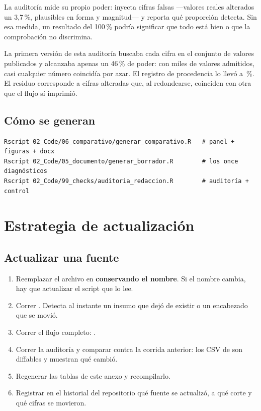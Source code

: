 \documentclass[11pt,a4paper]{article}
\begin{document}
\begin{hallazgo}[title={Una comprobación que nunca falla no demuestra nada}]
La auditoría mide su propio poder: inyecta cifras falsas —valores reales
alterados un 3,7\,\%, plausibles en forma y magnitud— y reporta qué proporción
detecta. Sin esa medida, un resultado del 100\,\% podría significar que todo
está bien o que la comprobación no discrimina.

La primera versión de esta auditoría buscaba cada cifra en el conjunto de
valores publicados y alcanzaba apenas un 46\,\% de poder: con miles de valores
admitidos, casi cualquier número coincidía por azar. El registro de procedencia
lo llevó a \cifraPoderDeteccion{}\,\%. El residuo corresponde a cifras alteradas
que, al redondearse, coinciden con otra que el flujo sí imprimió.
\end{hallazgo}

\subsection{Cómo se generan}

\begin{verbatim}
Rscript 02_Code/06_comparativo/generar_comparativo.R   # panel + figuras + docx
Rscript 02_Code/05_documento/generar_borrador.R        # los once diagnósticos
Rscript 02_Code/99_checks/auditoria_redaccion.R        # auditoría + control
\end{verbatim}

\section{Estrategia de actualización}

\subsection{Actualizar una fuente}

\begin{enumerate}[leftmargin=*, itemsep=3pt]
  \item Reemplazar el archivo en  \textbf{conservando
    el nombre}. Si el nombre cambia, hay que actualizar el script que lo lee.
  \item Correr . Detecta al
    instante un insumo que dejó de existir o un encabezado que se movió.
  \item Correr el flujo completo: .
  \item Correr la auditoría y comparar contra la corrida anterior: los CSV de
     son diffables y muestran qué cambió.
  \item Regenerar las tablas de este anexo y recompilarlo.
  \item Registrar en el historial del repositorio qué fuente se actualizó, a qué
    corte y qué cifras se movieron.
\end{enumerate}
\end{document}
